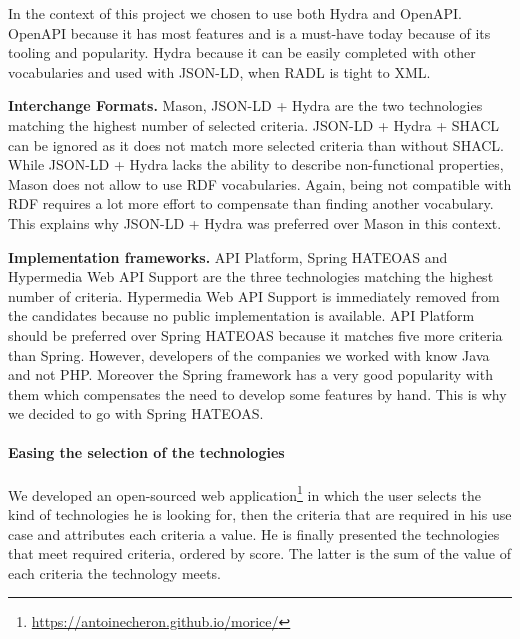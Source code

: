 In the context of this project we chosen to use both Hydra and OpenAPI. OpenAPI because it has most features and is a must-have today because of its tooling and popularity. Hydra because it can be easily completed with other vocabularies and used with JSON-LD, when RADL is tight to XML.

\textbf{Interchange Formats.} Mason, JSON-LD + Hydra are the two technologies matching the highest number of selected criteria. JSON-LD + Hydra + SHACL can be ignored as it does not match more selected criteria than without SHACL. While JSON-LD + Hydra lacks the ability to describe non-functional properties, Mason does not allow to use RDF vocabularies. Again, being not compatible with RDF requires a lot more effort to compensate than finding another vocabulary. This explains why JSON-LD + Hydra was preferred over Mason in this context.

\textbf{Implementation frameworks.} API Platform, Spring HATEOAS and Hypermedia Web API Support \cite{salvadori2014framework} are the three technologies matching the highest number of criteria. Hypermedia Web API Support is immediately removed from the candidates because no public implementation is available. API Platform should be preferred over Spring HATEOAS because it matches five more criteria than Spring. However, developers of the companies we worked with know Java and not PHP. Moreover the Spring framework has a very good popularity with them which compensates the need to develop some features by hand. This is why we decided to go with Spring HATEOAS.

\paragraph{Easing the selection of the technologies}
We developed an open-sourced web application\footnote{\url{https://antoinecheron.github.io/morice/}} in which the user selects the kind of technologies he is looking for, then the criteria that are required in his use case and attributes each criteria a value. He is finally presented the technologies that meet required criteria, ordered by score. The latter is the sum of the value of each criteria the technology meets.


